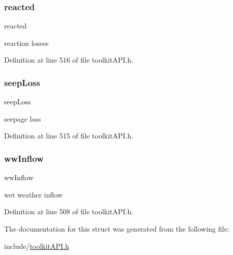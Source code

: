 \mbox{\label{struct_s_m___routing_totals_a97407af14eadcba842d2dfc60c256612}} 
\subsubsection{\texorpdfstring{reacted}{reacted}}
{\footnotesize\ttfamily reacted}

reaction losses 

Definition at line 516 of file toolkit\+A\+P\+I.\+h.

\mbox{\label{struct_s_m___routing_totals_af23b8cac0bd9aa9dab61553ddc423443}} 
\subsubsection{\texorpdfstring{seepLoss}{seepLoss}}
{\footnotesize\ttfamily seep\+Loss}

seepage loss 

Definition at line 515 of file toolkit\+A\+P\+I.\+h.

\mbox{\label{struct_s_m___routing_totals_addf6c3df2db37a38a6f6d64a585f9b50}} 
\subsubsection{\texorpdfstring{wwInflow}{wwInflow}}
{\footnotesize\ttfamily ww\+Inflow}

wet weather inflow 

Definition at line 508 of file toolkit\+A\+P\+I.\+h.



The documentation for this struct was generated from the following file\+:\begin{DoxyCompactItemize}
\item 
include/\mbox{\hyperlink{toolkit_a_p_i_8h}{toolkit\+A\+P\+I.\+h}}\end{DoxyCompactItemize}
